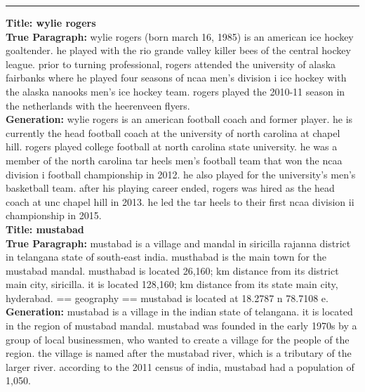 \documentclass[11pt,a4paper]{article}
\begin{document}
\begin{figure*}[t]
  \small
  \rule{\linewidth}{1pt}
    \noindent \textbf{Title: wylie rogers} \\
    
    \textbf{True Paragraph:} wylie rogers (born march 16, 1985) is an american ice hockey goaltender. he played with the rio grande valley killer bees of the central hockey league. prior to turning professional, rogers attended the university of alaska fairbanks where he played four seasons of ncaa men's division i ice hockey with the alaska nanooks men's ice hockey team. rogers played the 2010-11 season in the netherlands with the heerenveen flyers.\\

    \textbf{Generation:} wylie rogers is an american football coach and former player. he is currently the head football coach at the university of north carolina at chapel hill. rogers played college football at north carolina state university. he was a member of the north carolina tar heels men's football team that won the ncaa division i football championship in 2012. he also played for the university's men's basketball team. after his playing career ended, rogers was hired as the head coach at unc chapel hill in 2013. he led the tar heels to their first ncaa division ii championship in 2015. \\ 
    
    \vspace{2mm} \textbf{Title: mustabad}  \\
    
    \textbf{True Paragraph:} mustabad is a village and mandal in siricilla rajanna district in telangana state of south-east india. musthabad is the main town for the mustabad mandal. musthabad is located 26,160; km distance from its district main city, siricilla. it is located 128,160; km distance from its state main city, hyderabad. == geography == mustabad is located at 18.2787 \degree n 78.7108 \degree e.\\
    
    \textbf{Generation:} mustabad is a village in the indian state of telangana. it is located in the region of mustabad mandal.  mustabad was founded in the early 1970s by a group of local businessmen, who wanted to create a village for the people of the region. the village is named after the mustabad river, which is a tributary of the larger river.  according to the 2011 census of india, mustabad had a population of 1,050. \\ 
    

\end{figure*}
\end{document}
